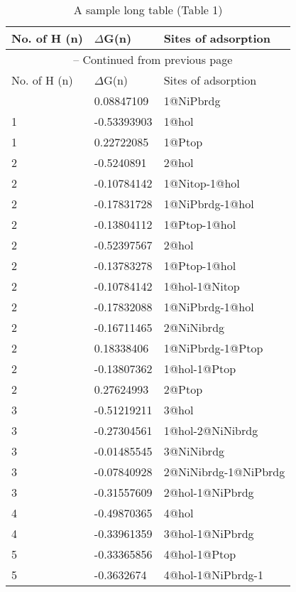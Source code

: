 
\clearpage
\begin{center}
\centering
\begin{longtable}{|l|l|l|}
\caption{A sample long table (Table 1)}
\label{tab:long1} \\
\hline
No. of H (n) & $\Delta$G(n) & Sites of adsorption \\ \hline
\endfirsthead

\multicolumn{3}{c}{\tablename\ \thetable{} -- Continued from previous page} \\ \hline
No. of H (n) & $\Delta$G(n) & Sites of adsorption \\ \hline
\endhead

\hline
\endfoot

\hline
\endlastfoot
1 & 0.08847109 & 1@NiPbrdg \\ \hline
1 & -0.53393903 & 1@hol \\ \hline
1 & 0.22722085 & 1@Ptop \\ \hline
2 & -0.5240891 & 2@hol \\ \hline
2 & -0.10784142 & 1@Nitop-1@hol \\ \hline
2 & -0.17831728 & 1@NiPbrdg-1@hol \\ \hline
2 & -0.13804112 & 1@Ptop-1@hol \\ \hline
2 & -0.52397567 & 2@hol \\ \hline
2 & -0.13783278 & 1@Ptop-1@hol \\ \hline
2 & -0.10784142 & 1@hol-1@Nitop \\ \hline
2 & -0.17832088 & 1@NiPbrdg-1@hol \\ \hline
2 & -0.16711465 & 2@NiNibrdg \\ \hline
2 & 0.18338406 & 1@NiPbrdg-1@Ptop \\ \hline
2 & -0.13807362 & 1@hol-1@Ptop \\ \hline
2 & 0.27624993 & 2@Ptop \\ \hline
3 & -0.51219211 & 3@hol \\ \hline
3 & -0.27304561 & 1@hol-2@NiNibrdg \\ \hline
3 & -0.01485545 & 3@NiNibrdg \\ \hline
3 & -0.07840928 & 2@NiNibrdg-1@NiPbrdg \\ \hline
3 & -0.31557609 & 2@hol-1@NiPbrdg \\ \hline
4 & -0.49870365 & 4@hol \\ \hline
4 & -0.33961359 & 3@hol-1@NiPbrdg \\ \hline
5 & -0.33365856 & 4@hol-1@Ptop \\ \hline
5 & -0.3632674 & 4@hol-1@NiPbrdg-1 \\ \hline

\end{longtable}
\end{center}
